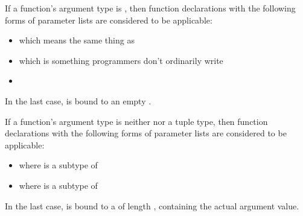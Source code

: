 If a function's argument type is \EXP{()},
then function declarations with the following forms of parameter lists are
considered to be applicable:
\begin{itemize}
\item   \EXP{()}
which means the same thing as \EXP{(\_\COLONOP())}
\item   {}
which is something programmers don't ordinarily write
\item   {}
\end{itemize}
In the last case,  is bound to an empty
.

If a function's argument type  is
    neither \EXP{()} nor a tuple type, then function declarations with the following forms of parameter lists are considered
    to be applicable:
\begin{itemize}
\item
               where  is a subtype of 
\item
         where  is a subtype of 
\end{itemize}
In the last case,  is bound to a
     of length ,
    containing  the actual argument value.

